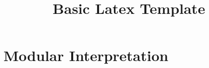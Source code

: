 \documentclass[11pt,a4paper]{amsart}
\title[Latex Template]{Basic Latex Template}
\theoremstyle{plain}
\theoremstyle{definition}
\theoremstyle{remark}
\numberwithin{equation}{section}
\newcommand{\1}{{\mathds 1}}
\begin{document}
\begin{abstract}
\end{abstract}

\maketitle

\section{Modular Interpretation}


\begin{bibdiv}
\begin{biblist}
\end{biblist}
\end{bibdiv}
\end{document}
